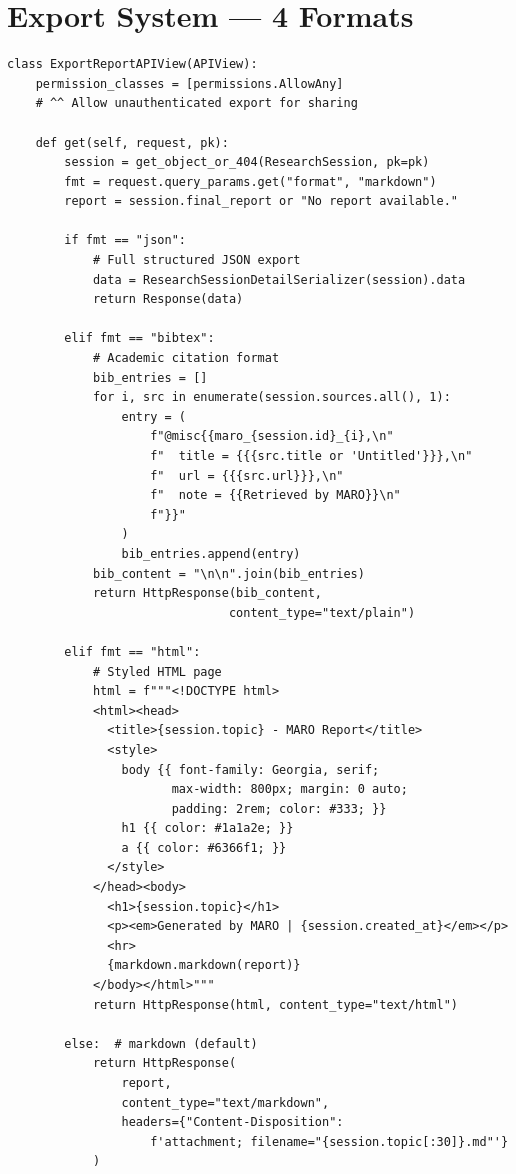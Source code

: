 \documentclass[11pt,a4paper,twoside]{report}
\begin{document}
\section{Export System --- 4 Formats}

\begin{lstlisting}[style=pythonstyle,caption={views.py --- Multi-Format Export}]
class ExportReportAPIView(APIView):
    permission_classes = [permissions.AllowAny]
    # ^^ Allow unauthenticated export for sharing

    def get(self, request, pk):
        session = get_object_or_404(ResearchSession, pk=pk)
        fmt = request.query_params.get("format", "markdown")
        report = session.final_report or "No report available."

        if fmt == "json":
            # Full structured JSON export
            data = ResearchSessionDetailSerializer(session).data
            return Response(data)

        elif fmt == "bibtex":
            # Academic citation format
            bib_entries = []
            for i, src in enumerate(session.sources.all(), 1):
                entry = (
                    f"@misc{{maro_{session.id}_{i},\n"
                    f"  title = {{{src.title or 'Untitled'}}},\n"
                    f"  url = {{{src.url}}},\n"
                    f"  note = {{Retrieved by MARO}}\n"
                    f"}}"
                )
                bib_entries.append(entry)
            bib_content = "\n\n".join(bib_entries)
            return HttpResponse(bib_content,
                               content_type="text/plain")

        elif fmt == "html":
            # Styled HTML page
            html = f"""<!DOCTYPE html>
            <html><head>
              <title>{session.topic} - MARO Report</title>
              <style>
                body {{ font-family: Georgia, serif;
                       max-width: 800px; margin: 0 auto;
                       padding: 2rem; color: #333; }}
                h1 {{ color: #1a1a2e; }}
                a {{ color: #6366f1; }}
              </style>
            </head><body>
              <h1>{session.topic}</h1>
              <p><em>Generated by MARO | {session.created_at}</em></p>
              <hr>
              {markdown.markdown(report)}
            </body></html>"""
            return HttpResponse(html, content_type="text/html")

        else:  # markdown (default)
            return HttpResponse(
                report,
                content_type="text/markdown",
                headers={"Content-Disposition":
                    f'attachment; filename="{session.topic[:30]}.md"'}
            )
\end{lstlisting}
\end{document}
